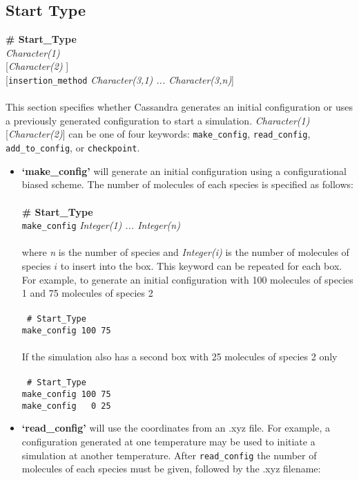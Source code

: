 \subsection{Start Type}\label{sec:Start_Type}
{\bf \# Start\_Type} \\
{\it Character(1) } \\
{[}{\it Character(2) }] \\
{[}{\tt insertion\_method} {\it Character(3,1) ... Character(3,n)}] \\ \\
%
This section specifies whether Cassandra generates an initial configuration or 
uses a previously generated configuration to start a simulation. 
{\it Character(1)} [{\it Character(2)}] can be one of four keywords:
{\tt make\_config}, {\tt read\_config}, {\tt add\_to\_config}, or {\tt checkpoint}.
%
\begin{itemize} 
\item \textbf{`make\_config'} will generate an initial configuration using a configurational biased scheme. 
The number of molecules of each species is specified as follows: \\ \\
%
{\bf \# Start\_Type} \\
{\tt make\_config} {\it Integer(1) ... Integer(n)} \\ \\
%
where {\it n} is the number of species and {\it Integer(i)} is the number of molecules of species $i$ to insert into the box. 
This keyword can be repeated for each box. 
For example, to generate an initial configuration with 100 molecules of species 1 and 75 molecules of species 2 \\ \\
%
 \texttt{
 \# Start\_Type \\
 make\_config 100 75 \\} \\
%
If the simulation also has a second box with 25 molecules of species 2 only \\ \\
%
 \texttt{
 \# Start\_Type \\
 make\_config 100 75\\
 make\_config \ \ 0 25\\}
%
\item {\textbf{`read\_config'}} will use the coordinates from an .xyz file.
For example, a configuration generated at one temperature may be used to initiate a simulation at another temperature. 
After {\tt read\_config} the number of molecules of each species must be given, followed by the .xyz filename: \\ \\

\end{itemize}
